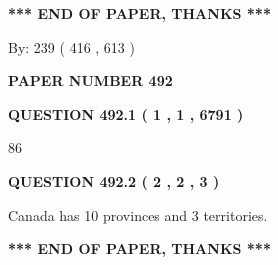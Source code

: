 \documentclass[12pt]{article}
\begin{document}
   
   
   
   
\vspace{1.0in} 
{\textbf{\large{ *** END OF PAPER, THANKS *** }}} 
   
   
\hspace{1.0in} By: 
 239 ( 416 ,  613 )
   
   
   
   
\newpage 
\setcounter{page}{ 
   492001 } 
   
   
   
   
 {\textbf{ \Large{ PAPER NUMBER  492  }}}
   
   
\vspace{0.2in}
   
   
   
   
   
   
 \vspace{0.2in}
 
 
 
 
   
   
  
\vspace{0.2in}
  
{\textbf{\Large{QUESTION
492.1 
 ( 1 , 1 , 6791 )
}}}
  
  
 
 
\noindent{}

86
 
 
  
\vspace{0.2in}
  
{\textbf{\Large{QUESTION
492.2 
 ( 2 , 2 , 3 )
}}}
  
  
 
 
\noindent{}
 
 
Canada has 10  provinces and 3 territories.
 
 
 
 
   
   
 \vspace{0.2in}
 
   
   
   
   
\vspace{1.0in} 
{\textbf{\large{ *** END OF PAPER, THANKS *** }}} 
   
\end{document}
